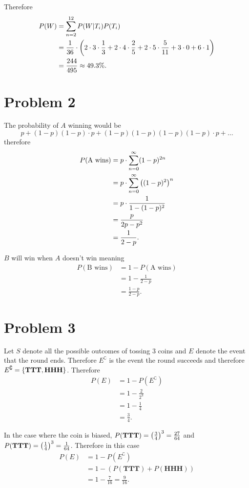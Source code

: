 \documentclass[12pt]{extarticle}
\begin{document}
Therefore
\begin{align*}
	P(W) &= \sum_{n=2}^{12} P(W|T_i) P(T_i) \\
	&= \frac{1}{36}\cdot\qty(
	2\cdot 3\cdot \frac{1}{3} + 2\cdot 4\cdot \frac{2}{5} + 2\cdot 5\cdot \frac{5}{11} + 3\cdot 0 + 6\cdot 1
	) \\
	&= \frac{244}{495} \approx 49.3\%
.\end{align*}

\section*{Problem 2}
The probability of $A$ winning would be
\[
	p + (1-p)(1-p)\cdot p + (1-p)(1-p)(1-p)(1-p)\cdot p + \ldots 
\]
therefore
\begin{align*}
	P(\text{A wins}) &= p \cdot \sum_{n=0}^\infty (1-p)^{2n} \\
						&= p \cdot \sum_{n=0}^\infty \qty((1-p)^2)^n \\
						&= p \cdot \frac{1}{1 - (1-p)^2} \\
						&= \frac{p}{2p - p^2} \\
						&= \frac{1}{2 - p}
.\end{align*}

$B$ will win when $A$ doesn't win meaning
\begin{align*}
	P(\text{B wins}) &= 1 - P(\text{A wins}) \\
						&= 1 - \frac{1}{2-p} \\
						&= \frac{1-p}{2-p}
.\end{align*}

\section*{Problem 3}
Let $S$ denote all the possible outcomes of tossing $3$ coins and $E$ denote the event that the round ends. Therefore $E^\complement$ is the event the round succeeds and therefore $E^\complement = \qty{\textbf{TTT}, \textbf{HHH}}$. Therefore
\begin{align*}
	P(E) &= 1 - P(E^\complement) \\
			 &= 1 - \frac{2}{2^3} \\
			 &= 1 - \frac{1}{4} \\
			 &= \frac{3}{4}
.\end{align*}

In the case where the coin is biased, $P(\textbf{TTT}) = \qty(\frac{3}{4})^3 = \frac{27}{64}$ and $P(\textbf{TTT}) = \qty(\frac{1}{4})^3 = \frac{1}{64}$. Therefore in this case
\begin{align*}
	P(E) &= 1 - P(E^\complement) \\
			 &= 1 - (P(\textbf{TTT}) + P(\textbf{HHH})) \\
			 &= 1 - \frac{7}{16}
			 = \frac{9}{16}
.\end{align*}
\end{document}
